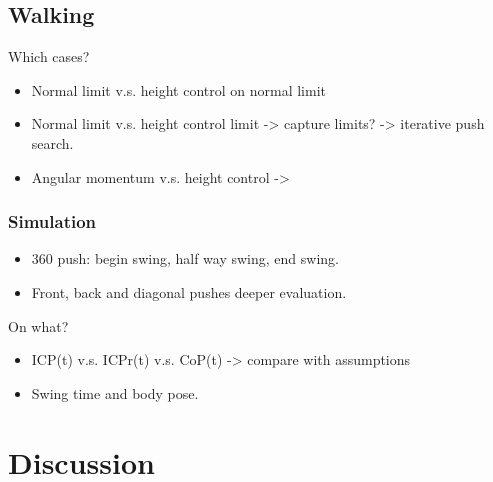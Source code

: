 \subsection{Walking}
Which cases? 
\begin{itemize}
	\item Normal limit v.s. height control on normal limit
	\item Normal limit v.s. height control limit -> capture limits? -> iterative push search.
	\item Angular momentum v.s. height control -> 
\end{itemize}
\subsubsection{Simulation}
\begin{itemize}
	\item 360 push: begin swing, half way swing, end swing.
	\item Front, back and diagonal pushes deeper evaluation.
\end{itemize}

On what?
\begin{itemize}
	\item ICP(t) v.s. ICPr(t) v.s. CoP(t) -> compare with assumptions
	\item Swing time and body pose.
\end{itemize}


\section{Discussion}
